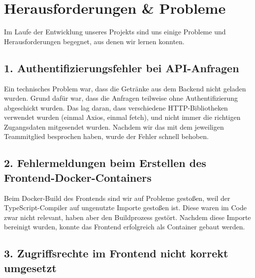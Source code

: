 \documentclass[conference,a4paper]{cs-techrep}
\begin{document}


\section{Herausforderungen \& Probleme}

Im Laufe der Entwicklung unseres Projekts sind uns einige Probleme und Herausforderungen begegnet, aus denen wir lernen konnten.

\subsection*{1. Authentifizierungsfehler bei API-Anfragen}

Ein technisches Problem war, dass die Getränke aus dem Backend nicht geladen wurden. Grund dafür war, dass die Anfragen teilweise ohne Authentifizierung abgeschickt wurden. Das lag daran, dass verschiedene HTTP-Bibliotheken verwendet wurden (einmal Axios, einmal fetch), und nicht immer die richtigen Zugangsdaten mitgesendet wurden. Nachdem wir das mit dem jeweiligen Teammitglied besprochen haben, wurde der Fehler schnell behoben.

\subsection*{2. Fehlermeldungen beim Erstellen des Frontend-Docker-Containers}

Beim Docker-Build des Frontends sind wir auf Probleme gestoßen, weil der TypeScript-Compiler auf ungenutzte Importe gestoßen ist. Diese waren im Code zwar nicht relevant, haben aber den Buildprozess gestört. Nachdem diese Importe bereinigt wurden, konnte das Frontend erfolgreich als Container gebaut werden.

\subsection*{3. Zugriffsrechte im Frontend nicht korrekt umgesetzt}
\end{document}
